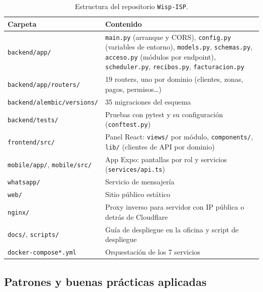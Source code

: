 \begin{table}[H]
\centering
\caption{Estructura del repositorio \texttt{Wisp-ISP}.}
\label{tab:ce02-e3-repo}
\small
\begin{tabularx}{\textwidth}{L{4.4cm}X}
\toprule
\textbf{Carpeta} & \textbf{Contenido} \\
\midrule
\texttt{backend/app/} & \texttt{main.py} (arranque y CORS), \texttt{config.py} (variables de entorno), \texttt{models.py}, \texttt{schemas.py}, \texttt{acceso.py} (módulos por endpoint), \texttt{scheduler.py}, \texttt{recibos.py}, \texttt{facturacion.py} \\
\texttt{backend/app/routers/} & 19 routers, uno por dominio (clientes, zonas, pagos, permisos\ldots) \\
\texttt{backend/alembic/versions/} & 35 migraciones del esquema \\
\texttt{backend/tests/} & Pruebas con pytest y su configuración (\texttt{conftest.py}) \\
\texttt{frontend/src/} & Panel React: \texttt{views/} por módulo, \texttt{components/}, \texttt{lib/} (clientes de API por dominio) \\
\texttt{mobile/app/}, \texttt{mobile/src/} & App Expo: pantallas por rol y servicios (\texttt{services/api.ts}) \\
\texttt{whatsapp/} & Servicio de mensajería \\
\texttt{web/} & Sitio público estático \\
\texttt{nginx/} & Proxy inverso para servidor con IP pública o detrás de Cloudflare \\
\texttt{docs/}, \texttt{scripts/} & Guía de despliegue en la oficina y script de despliegue \\
\texttt{docker-compose*.yml} & Orquestación de los 7 servicios \\
\bottomrule
\end{tabularx}
\end{table}

\subsection{Patrones y buenas prácticas aplicadas}

